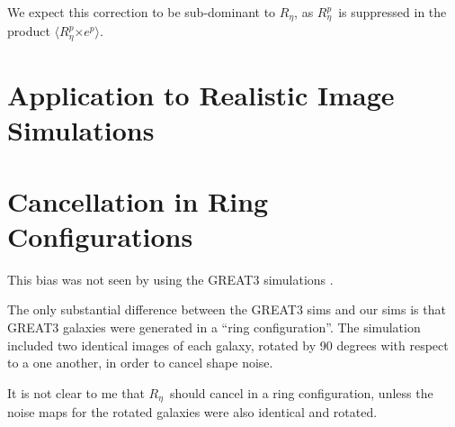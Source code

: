 \documentclass[usegraphicx,usenatbib]{mn2e}
\newcommand{\mcalRpsfnoise}{$R^{p}_\eta$}
\newcommand{\mcalRnoise}{$R_\eta$}
\begin{document}
We expect this correction to be sub-dominant to \mcalRnoise, as \mcalRpsfnoise\
is suppressed in the product $\langle$\mcalRpsfnoise$ \times e^{p}\rangle$.

\section{Application to Realistic Image Simulations}

\section{Cancellation in Ring Configurations}

This bias was not seen by \cite{HuffMcal} using the GREAT3 simulations
\citep{great3}.

The only substantial difference between the GREAT3 sims and our sims is that
GREAT3 galaxies were generated in a ``ring configuration''.  The simulation
included two identical images of each galaxy, rotated by 90 degrees with
respect to a one another, in order to cancel shape noise.

It is not clear to me that \mcalRnoise\ should cancel in a ring configuration,
unless the noise maps for the rotated galaxies were also identical and rotated.





\end{document}
